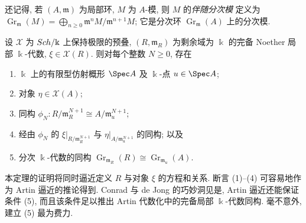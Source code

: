 还记得, 若 $(A,\mathfrak m)$ 为局部环, $M$ 为 $A$-模, 则 $M$ 的\textit{伴随分次模} 定义为 $\operatorname{Gr}_{\mathfrak m}(M)=\bigoplus_{n\geq0}\mathfrak m^nM/\mathfrak m^{n+1}M$; 它是分次环 $\operatorname{Gr}_{\mathfrak m}(A)$ 上的分次模.
\begin{theorem}\label{src:C.6.2}
设 $\mathcal X$ 为 $Sch/\Bbbk$ 上保持极限的预叠, $(R,\mathfrak m_R)$ 为剩余域为 $\Bbbk$ 的完备 Noether 局部 $\Bbbk$-代数, $\xi\in\mathcal X(R)$. 则对每个整数 $N\geq0$, 存在
\begin{enumerate}[(1)]
\item $\Bbbk$ 上的有限型仿射概形 $\Spec A$ 及 $\Bbbk$-点 $u\in\Spec A$;
\item 对象 $\eta\in\mathcal X(A)$;
\item 同构 $\phi_N:R/\mathfrak m_R^{N+1}\cong A/\mathfrak m_u^{N+1}$;
\item 经由 $\phi_N$ 的 $\xi|_{R/\mathfrak m_R^{N+1}}$ 与 $\eta|_{A/\mathfrak m_u^{N+1}}$ 的同构; 以及
\item 分次 $\Bbbk$-代数的同构 $\operatorname{Gr}_{\mathfrak m_R}(R)\cong\operatorname{Gr}_{\mathfrak m_u}(A)$.
\end{enumerate}
\end{theorem}
本定理的证明将同时逼近定义 $R$ 与对象 $\xi$ 的方程和关系. 断言 (1)--(4) 可容易地作为 Artin 逼近的推论得到. Conrad 与 de Jong 的巧妙洞见是, Artin 逼近还能保证条件 (5), 而且该条件足以推出 Artin 代数化中的完备局部 $\Bbbk$-代数同构. 毫不意外, 建立 (5) 最为费力.


